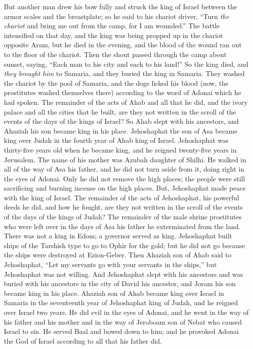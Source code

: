 \begin{biblechapter}
\verse But another man drew his bow fully and struck the king of Israel between the armor scales and the breastplate; so he said to his chariot driver, “Turn \textit{the chariot} and bring me out from the camp, for I am wounded.”
\verse The battle intensified on that day, and the king was being propped up in the chariot opposite Aram, but he died in the evening, and the blood of the wound ran out to the floor of the chariot.
\verse Then the shout passed through the camp about sunset, saying, “Each man to his city and each to his land!”
\verse So the king died, and \textit{they brought him} to Samaria, and they buried the king in Samaria.
\verse They washed the chariot by the pool of Samaria, and the dogs licked his blood (now, the prostitutes washed themselves there) according to the word of Adonai which he had spoken.
\verse The remainder of the acts of Ahab and all that he did, and the ivory palace and all the cities that he built, are they not written in the scroll of the events of the days of the kings of Israel?
\verse So Ahab slept with his ancestors, and Ahaziah his son became king in his place.
 Jehoshaphat the son of Asa became king over Judah in the fourth year of Ahab king of Israel.
\verse Jehoshaphat was thirty-five years old when he became king, and he reigned twenty-five years in Jerusalem. The name of his mother was Azubah daughter of Shilhi.
\verse He walked in all of the way of Asa his father, and he did not turn aside from it, doing right in the eyes of Adonai. Only he did not remove the high places; the people were still sacrificing and burning incense on the high places.
\verse  But, Jehoshaphat made peace with the king of Israel.
\verse The remainder of the acts of Jehoshaphat, his powerful deeds he did, and how he fought, are they not written in the scroll of the events of the days of the kings of Judah?
\verse The remainder of the male shrine prostitutes who were left over in the days of Asa his father he exterminated from the land.
\verse There was not a king in Edom; a governor served as king.
\verse Jehoshaphat built ships of the Tarshish type to go to Ophir for the gold; but he did not go because the ships were destroyed at Ezion-Geber.
\verse Then Ahaziah son of Ahab said to Jehoshaphat, “Let my servants go with your servants in the ships,” but Jehoshaphat was not willing.
\verse And Jehoshaphat slept with his ancestors and was buried with his ancestors in the city of David his ancestor, and Joram his son became king in his place.
 Ahaziah son of Ahab became king over Israel in Samaria in the seventeenth year of Jehoshaphat king of Judah, and he reigned over Israel two years.
\verse He did evil in the eyes of Adonai, and he went in the way of his father and his mother and in the way of Jeroboam son of Nebat who caused Israel to sin.
\verse He served Baal and bowed down to him; and he provoked Adonai the God of Israel according to all that his father did.
\end{biblechapter}

